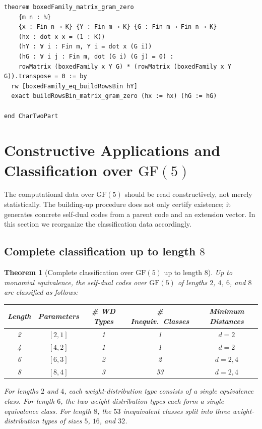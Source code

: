 \documentclass[12pt]{article}
\newtheorem{theorem}{Theorem}[section]
\newcommand{\GF}[1]{\ensuremath{\mathrm{GF}(#1)}}
\begin{document}
\begin{lstlisting}[caption={Lean verification for Theorem~\ref{thm:CZ_Kim_Lagrangian}.}]
theorem boxedFamily_matrix_gram_zero
    {m n : ℕ}
    {x : Fin n → K} {Y : Fin m → K} {G : Fin m → Fin n → K}
    (hx : dot x x = (1 : K))
    (hY : ∀ i : Fin m, Y i = dot x (G i))
    (hG : ∀ i j : Fin m, dot (G i) (G j) = 0) :
    rowMatrix (boxedFamily x Y G) * (rowMatrix (boxedFamily x Y G)).transpose = 0 := by
  rw [boxedFamily_eq_buildRowsBin hY]
  exact buildRowsBin_matrix_gram_zero (hx := hx) (hG := hG)

end CharTwoPart
\end{lstlisting}

\section{Constructive Applications and Classification over \texorpdfstring{$\GF{5}$}{GF(5)}}
\label{sec:classification}

The computational data over $\GF{5}$ should be read constructively, not merely statistically. The building-up procedure does not only certify existence; it generates concrete self-dual codes from a parent code and an extension vector. In this section we reorganize the classification data accordingly.

\subsection{Complete classification up to length $8$}

\begin{theorem}[Complete classification over $\GF{5}$ up to length $8$]
Up to monomial equivalence, the self-dual codes over $\GF{5}$ of lengths $2$, $4$, $6$, and $8$ are classified as follows:
\begin{center}
\begin{tabular}{ccccc}
\toprule
Length & Parameters & \# WD Types & \# Inequiv.\ Classes & Minimum Distances \\
\midrule
2 & $[2,1]$ & 1 & 1 & $d = 2$ \\
4 & $[4,2]$ & 1 & 1 & $d = 2$ \\
6 & $[6,3]$ & 2 & 2 & $d = 2,4$ \\
8 & $[8,4]$ & 3 & 53 & $d = 2,4$ \\
\bottomrule
\end{tabular}
\end{center}
For lengths $2$ and $4$, each weight-distribution type consists of a single equivalence class. For length $6$, the two weight-distribution types each form a single equivalence class. For length $8$, the $53$ inequivalent classes split into three weight-distribution types of sizes $5$, $16$, and $32$.
\end{theorem}
\end{document}

